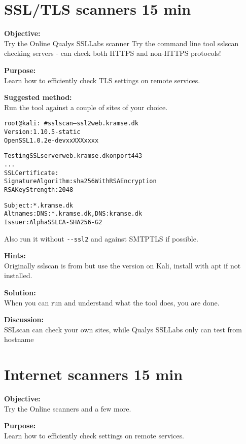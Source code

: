 \documentclass[a4paper,11pt,notitlepage]{report}
\begin{document}
\chapter{SSL/TLS scanners 15 min}
\label{ex:sslscan}

{\bf Objective:}\\
Try the Online Qualys SSLLabs scanner 
Try the command line tool sslscan checking servers - can check both HTTPS and non-HTTPS protocols!

{\bf Purpose:}\\
Learn how to efficiently check TLS settings on remote services.

{\bf Suggested method:}\\
Run the tool against a couple of sites of your choice.

\begin{alltt}\small
root@kali:~# sslscan --ssl2 web.kramse.dk
Version: 1.10.5-static
OpenSSL 1.0.2e-dev xx XXX xxxx

Testing SSL server web.kramse.dk on port 443
...
  SSL Certificate:
Signature Algorithm: sha256WithRSAEncryption
RSA Key Strength:    2048

Subject:  *.kramse.dk
Altnames: DNS:*.kramse.dk, DNS:kramse.dk
Issuer:   AlphaSSL CA - SHA256 - G2
\end{alltt}

Also run it without \verb+--ssl2+ and against SMTPTLS if possible.

{\bf Hints:}\\
Originally sslscan is from  but use the version on Kali, install with apt if not installed.

{\bf Solution:}\\
When you can run and understand what the tool does, you are done.

{\bf Discussion:}\\
SSLscan can check your own sites, while Qualys SSLLabs only can test from hostname



\chapter{Internet scanners 15 min}
\label{ex:web-site-check}

{\bf Objective:}\\
Try the Online scanners  and a few more.

{\bf Purpose:}\\
Learn how to efficiently check settings on remote services.
\end{document}
